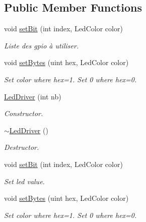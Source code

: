 \subsection*{Public Member Functions}
\begin{DoxyCompactItemize}
\item 
\mbox{\label{classLedDriver_af5ec63943cb92b14a887fdd2a5491e93}} 
void \hyperlink{classLedDriver_af5ec63943cb92b14a887fdd2a5491e93}{set\+Bit} (int index, Led\+Color color)
\begin{DoxyCompactList}\small\item\em Liste des gpio à utiliser. \end{DoxyCompactList}\item 
void \hyperlink{classLedDriver_a66512dd673a81681d3597e301af13759}{set\+Bytes} (uint hex, Led\+Color color)
\begin{DoxyCompactList}\small\item\em Set color where hex=1. Set 0 where hex=0. \end{DoxyCompactList}\item 
\mbox{\label{classLedDriver_a23265705c54ed45e32b91ed9b2f4e0b6}} 
\hyperlink{classLedDriver_a23265705c54ed45e32b91ed9b2f4e0b6}{Led\+Driver} (int nb)
\begin{DoxyCompactList}\small\item\em Constructor. \end{DoxyCompactList}\item 
\mbox{\label{classLedDriver_a8b6afd79e2715068ff08c51a9df28065}} 
\hyperlink{classLedDriver_a8b6afd79e2715068ff08c51a9df28065}{$\sim$\+Led\+Driver} ()
\begin{DoxyCompactList}\small\item\em Destructor. \end{DoxyCompactList}\item 
void \hyperlink{classLedDriver_af5ec63943cb92b14a887fdd2a5491e93}{set\+Bit} (int index, Led\+Color color)
\begin{DoxyCompactList}\small\item\em Set led value. \end{DoxyCompactList}\item 
void \hyperlink{classLedDriver_a66512dd673a81681d3597e301af13759}{set\+Bytes} (uint hex, Led\+Color color)
\begin{DoxyCompactList}\small\item\em Set color where hex=1. Set 0 where hex=0. \end{DoxyCompactList}\item 

\end{DoxyCompactItemize}

